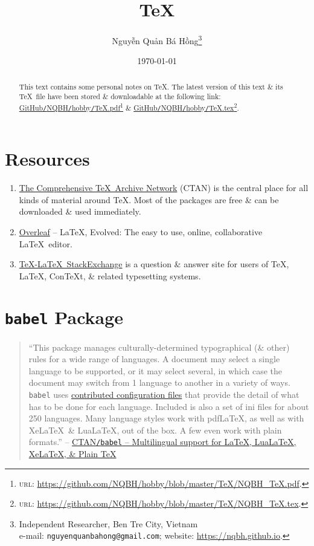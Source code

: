 \documentclass{article}
\title{\TeX}
\author{\selectlanguage{vietnamese} Nguyễn Quản Bá Hồng\footnote{Independent Researcher, Ben Tre City, Vietnam\\e-mail: \texttt{nguyenquanbahong@gmail.com}; website: \url{https://nqbh.github.io}.}}
\date{\today}
\numberwithin{equation}{section}
\begin{document}
\maketitle
\begin{abstract}
	This text contains some personal notes on \TeX. The latest version of this text \& its \TeX\ file have been stored \& downloadable at the following link: \href{https://github.com/NQBH/hobby/blob/master/TeX/NQBH_TeX.pdf}{GitHub\texttt{/}NQBH\texttt{/}hobby\texttt{/}\TeX.pdf}\footnote{\textsc{url}: \url{https://github.com/NQBH/hobby/blob/master/TeX/NQBH_TeX.pdf}.} \& \href{https://github.com/NQBH/hobby/blob/master/TeX/NQBH_TeX.tex}{GitHub\texttt{/}NQBH\texttt{/}hobby\texttt{/}\TeX.tex}\footnote{\textsc{url}: \url{https://github.com/NQBH/hobby/blob/master/TeX/NQBH_TeX.tex}.}.
\end{abstract}
\tableofcontents


\section*{Resources}

\begin{enumerate}
	\item \href{https://ctan.org/}{The Comprehensive \TeX\ Archive Network} (CTAN) is the central place for all kinds of material around \TeX. Most of the packages are free \& can be downloaded \& used immediately.
	\item \href{https://www.overleaf.com/}{Overleaf} -- \LaTeX, Evolved: The easy to use, online, collaborative \LaTeX\ editor.
	\item \href{https://tex.stackexchange.com/}{\TeX-\LaTeX\ StackExchange} is a question \& answer site for users of \TeX, \LaTeX, ConTeXt, \& related typesetting systems.
\end{enumerate}


\section{\texttt{babel} Package}
\begin{quotation}
	``This package manages culturally-determined typographical (\& other) rules for a wide range of languages. A document may select a single language to be supported, or it may select several, in which case the document may switch from 1 language to another in a variety of ways. \texttt{babel} uses \href{https://ctan.org/pkg/babel-contrib}{contributed configuration files} that provide the detail of what has to be done for each language. Included is also a set of ini files for about 250 languages. Many language styles work with pdf\LaTeX, as well as with Xe\LaTeX\ \& Lua\LaTeX, out of the box. A few even work with plain formats.'' -- \href{https://ctan.org/pkg/babel}{CTAN\texttt{/}\texttt{babel} -- Multilingual support for \LaTeX, Lua\LaTeX, Xe\LaTeX, \& Plain \TeX}
\end{quotation}
\end{document}
